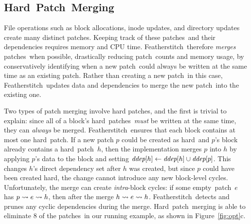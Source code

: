 \documentclass[9pt,twocolumn,letterpaper]{article}
\newcommand{\Kudos}{Featherstitch}
\newcommand{\patch}{patch}
\newcommand{\patches}{patches}
\newcommand{\Patch}{Patch}
\newcommand{\noop}{empty}
\newcommand{\nrb}{hard}
\newcommand{\Nrb}{Hard}
\begin{document}

\subsection{\Nrb\ \Patch\ Merging}
\label{sec:patch:merge}

File operations such as block allocations, inode updates, and directory updates
create many distinct \patches. Keeping track of these
\patches\ and their dependencies requires memory and
CPU time.
%
\Kudos\ therefore \emph{merges} \patches\ when possible, drastically reducing
\patch\ counts and memory usage, by conservatively identifying when a
new \patch\ could always be written at the same time as an existing \patch.
%
Rather than creating a new \patch\ in this case, \Kudos\ updates data
and dependencies to merge the new \patch\ into the existing one.


Two types of patch merging involve hard patches, and the first is trivial
to explain:
%
since all of a block's \nrb\ \patches\ \emph{must} be written at the same
time, they can \emph{always} be merged.
%
\Kudos\ ensures that each block contains at most one \nrb\ \patch.
%
If a new patch $p$ could be created as \nrb\ and $p$'s
block already contains a \nrb\ \patch\ $h$, then
%
the implementation merges $p$ into $h$ by applying $p$'s data to the block
and setting $\textit{ddep}[h] \gets \textit{ddep}[h] \cup \textit{ddep}[p]$.
%
%
This changes $h$'s direct dependency set after $h$ was created, but
since $p$ could have been created \nrb, the change cannot introduce any new
block-level cycles.
%
Unfortunately, the merge can create \emph{intra}-block cycles:
%
if some \noop\ \patch\ $e$ has $p \leadsto e \leadsto h$, then after
the merge $h \leadsto e \leadsto h$.
%
\Kudos\ detects and prunes any cyclic
dependencies during the merge.
%
\Nrb\ \patch\ merging is able to eliminate 8 of the \patches\ in our running
example, as shown in Figure~\ref{fig:opt}c.
\end{document}
